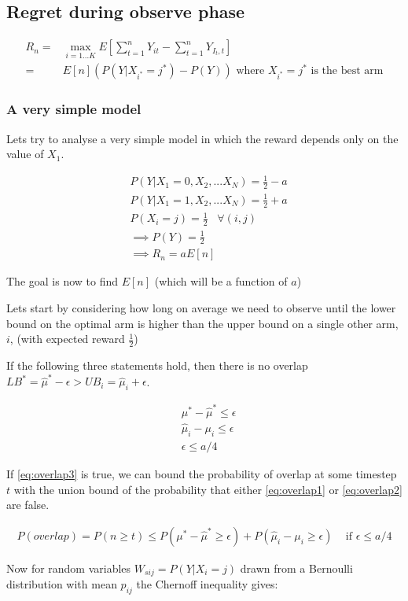 \documentclass{article}
\newcommand{\eqn}[1]{\begin{align}#1\end{align}}
\theoremstyle{plain}
\theoremstyle{definition}
\begin{document}
\subsection{Regret during observe phase}


\eqn {
R_n = & \max_{i=1...K} E\left[\sum_{t=1}^n Y_{it} - \sum_{t=1}^n Y_{I_t,t} \right] \\
= & E[n]\left(P(Y|X_{i^*}={j^*})  - P(Y)\right) \text{ where } X_{i^*}={j^*} \text{ is the best arm}
}

 
\subsubsection{A very simple model}

Lets try to analyse a very simple model in which the reward depends only on the value of $X_1$.

\eqn{
&P(Y|X_1=0,X_2,...X_N) = \frac{1}{2}-a\\
&P(Y|X_1=1,X_2,...X_N) = \frac{1}{2}+a\\
&P(X_i = j) = \frac{1}{2} \;\;\; \forall (i,j)\\
&\implies P(Y) = \frac{1}{2} \\
&\implies R_n = aE[n]
}

The goal is now to find $E[n]$ (which will be a function of $a$)

Lets start by considering how long on average we need to observe until the lower bound on the optimal arm is higher than the upper bound on a single other arm, $i$, (with expected reward $\frac{1}{2}$)

If the following three statements hold, then there is no overlap $LB^* = \hat{\mu}^* - \epsilon > UB_i = \hat{\mu}_i + \epsilon$.

\eqn {
\label{eq:overlap1}
&\mu^* - \hat{\mu}^* \leq \epsilon \\
\label{eq:overlap2}
&\hat{\mu}_i - \mu_i \leq \epsilon \\
\label{eq:overlap3}
&\epsilon \leq a/4
}

If \ref{eq:overlap3} is true, we can bound the probability of overlap at some timestep $t$ with the union bound of the probability that either \ref{eq:overlap1} or \ref{eq:overlap2} are false.

\eqn {
P(overlap) = P(n \geq t) \leq 
P(\mu^* - \hat{\mu}^* \geq \epsilon) + P(\hat{\mu}_i - \mu_i \geq \epsilon)  \;\;\;\text{ if } \epsilon \leq a/4
}


Now for random variables $W_{sij} = P(Y|X_i=j)$ drawn from a Bernoulli distribution with mean $p_{ij}$ the Chernoff inequality gives:
\end{document}
